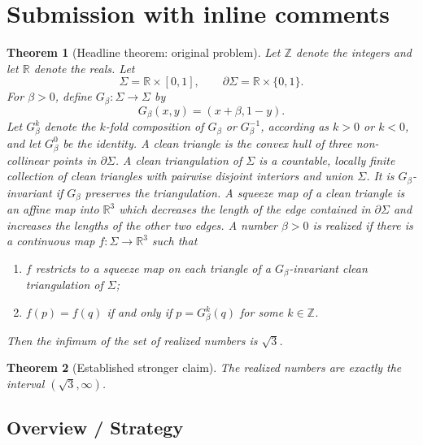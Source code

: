 \documentclass[12pt]{article}
\newcommand{\R}{\mathbb R}
\newcommand{\Z}{\mathbb Z}
\theoremstyle{plain}
\newtheorem{theorem}{Theorem}
\begin{document}
  \section{Submission with inline comments}


\date{}


\begin{theorem}[Headline theorem: original problem]\label{thm:headline}
\normalfont
Let \(\Z\) denote the integers and let \(\R\) denote the reals.  Let
\[
\Sigma=\R\times[0,1],\qquad \partial\Sigma=\R\times\{0,1\}.
\]
For \(\beta>0\), define \(G_\beta:\Sigma\to\Sigma\) by
\[
G_\beta(x,y)=(x+\beta,1-y).
\]
Let \(G_\beta^k\) denote the \(k\)-fold composition of \(G_\beta\) or
\(G_\beta^{-1}\), according as \(k>0\) or \(k<0\), and let
\(G_\beta^0\) be the identity.  A \emph{clean triangle} is the convex hull of
three non-collinear points in \(\partial\Sigma\).  A \emph{clean triangulation}
of \(\Sigma\) is a countable, locally finite collection of clean triangles
with pairwise disjoint interiors and union \(\Sigma\).  It is
\(G_\beta\)-\emph{invariant} if \(G_\beta\) preserves the triangulation.  A
\emph{squeeze map} of a clean triangle is an affine map into \(\R^3\) which
decreases the length of the edge contained in \(\partial\Sigma\) and increases
the lengths of the other two edges.  A number \(\beta>0\) is \emph{realized}
if there is a continuous map \(f:\Sigma\to\R^3\) such that
\begin{enumerate}
\item \(f\) restricts to a squeeze map on each triangle of a
\(G_\beta\)-invariant clean triangulation of \(\Sigma\);
\item \(f(p)=f(q)\) if and only if \(p=G_\beta^k(q)\) for some \(k\in\Z\).
\end{enumerate}
Then the infimum of the set of realized numbers is \(\sqrt3\).
\end{theorem}

\begin{theorem}[Established stronger claim]\label{thm:strong}
The realized numbers are exactly the interval \((\sqrt3,\infty)\).
\end{theorem}

\subsection*{Overview / Strategy}
\end{document}
